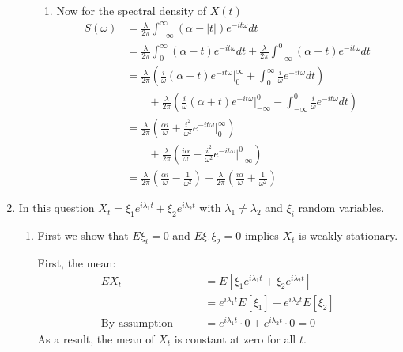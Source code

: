 \documentclass[12pt]{article}
\theoremstyle{plain}
\theoremstyle{definition}
\theoremstyle{remark}
\begin{document}
\begin{enumerate}
\begin{enumerate}
\begin{enumerate}
        \item Now for the spectral density of $X(t)$
        \begin{align*}
          S(\omega)
           &= \frac{\lambda}{2\pi} \int^\infty_{-\infty} (\alpha-|t|)e^{-it\omega}  dt\\
           &= \frac{\lambda}{2\pi} \int^\infty_{0} (\alpha-t)e^{-it\omega} dt
              + \frac{\lambda}{2\pi}\int^0_{-\infty} (\alpha+t)e^{-it\omega} dt \\
           &= \frac{\lambda}{2\pi}
              \left( \frac{i}{\omega}(\alpha-t)e^{-it\omega} \big|^\infty_0
              + \int^\infty_{0} \frac{i}{\omega}e^{-it\omega} dt
              \right) \\
            &\qquad
             + \frac{\lambda}{2\pi}
              \left( \frac{i}{\omega}(\alpha+t)e^{-it\omega} \big|^0_{-\infty}
              - \int^0_{-\infty} \frac{i}{\omega}e^{-it\omega} dt
              \right) \\
           &= \frac{\lambda}{2\pi}
              \left(
                \frac{\alpha i}{\omega} +
                \frac{i^2}{\omega^2}e^{-it\omega}\big|_0^\infty
              \right) \\
            &\qquad
             + \frac{\lambda}{2\pi}
              \left( \frac{i \alpha}{\omega}
              -  \frac{i^2}{\omega^2}e^{-it\omega}\big|^0_{-\infty}
              \right) \\
           &= \frac{\lambda}{2\pi}
              \left(
                \frac{\alpha i}{\omega} -
                \frac{1}{\omega^2}
              \right)
             + \frac{\lambda}{2\pi}
              \left( \frac{i \alpha}{\omega}
              +  \frac{1}{\omega^2}
              \right)
        \end{align*}
      \end{enumerate}
    \end{enumerate}

  \item %
    In this question $X_t = \xi_1 e^{i\lambda_1 t} + \xi_2
    e^{i\lambda_2 t}$ with $\lambda_1 \neq \lambda_2$ and $\xi_i$ random
    variables.
    \begin{enumerate}
      \item %
        First we show that $E\xi_i=0$ and $E\xi_1\xi_2=0$ implies $X_t$
        is weakly stationary.

        First, the mean:
        \begin{align*}
          EX_t &= E[ \xi_1 e^{i\lambda_1 t} + \xi_2e^{i\lambda_2 t}] \\
          &=  e^{i\lambda_1 t}E[ \xi_1] + e^{i\lambda_2 t}E[\xi_2] \\
          \text{By assumption} \qquad
          &=  e^{i\lambda_1 t}\cdot 0 + e^{i\lambda_2 t}\cdot 0 = 0
        \end{align*}
        As a result, the mean of $X_t$ is constant at zero for all $t$.


\end{enumerate}
\end{enumerate}
\end{document}
